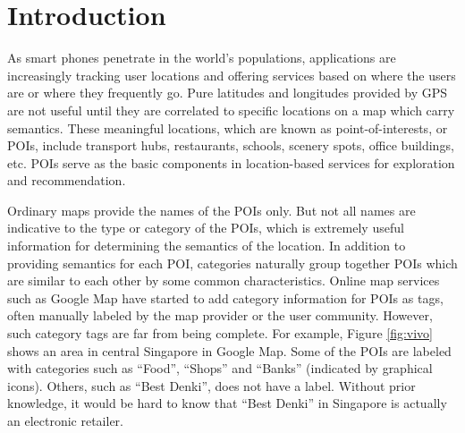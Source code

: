 \section{Introduction}
\label{intro}
As smart phones penetrate in the world's populations,
applications are increasingly
tracking user locations and offering services based on where the users are or
where they frequently go. Pure latitudes and longitudes provided by GPS
are not useful until they are correlated to specific locations on a map which
carry semantics. These meaningful locations, which are known as
point-of-interests, or POIs, include transport hubs, restaurants,
schools, scenery spots, office buildings, etc. POIs serve as the
basic components in location-based services for exploration and recommendation.

Ordinary maps provide the names of the POIs only. But not all names are
indicative to the type or category of the POIs, which is extremely useful
information for determining the semantics of the location.
In addition to providing semantics for each POI, categories
naturally group together POIs which are similar to each other
by some common characteristics.
Online map services such as Google Map have started to add
category information for
POIs as tags, often manually labeled by the map provider or the user community.
However, such category tags are far from being complete.
For example, Figure \ref{fig:vivo} shows an area in
central Singapore in Google Map.
Some of the POIs are labeled with categories such as ``Food'',
``Shops'' and ``Banks'' (indicated by graphical icons).
Others, such as ``Best Denki'', does not have a label.
Without prior knowledge, it would be hard to know that ``Best Denki''
in Singapore is actually an electronic retailer.

